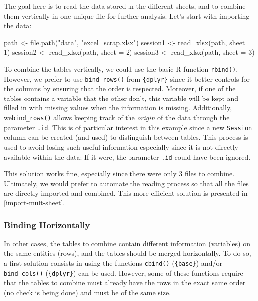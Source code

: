 \documentclass[
]{krantz}
\makeatletter
\newenvironment{Shaded}{\begin{snugshade}}{\end{snugshade}}
\newcommand{\AttributeTok}[1]{\textcolor[rgb]{0.61,0.61,0.61}{#1}}
\newcommand{\DecValTok}[1]{\textcolor[rgb]{0.06,0.06,0.06}{#1}}
\newcommand{\FunctionTok}[1]{\textcolor[rgb]{0,0,0}{#1}}
\newcommand{\NormalTok}[1]{#1}
\newcommand{\OtherTok}[1]{\textcolor[rgb]{0.37,0.37,0.37}{#1}}
\newcommand{\StringTok}[1]{\textcolor[rgb]{0.5,0.5,0.5}{#1}}
\newenvironment{kframe}{%
\medskip{}
\setlength{\fboxsep}{.8em}
 \def\at@end@of@kframe{}%
 \ifinner\ifhmode%
  \def\at@end@of@kframe{\end{minipage}}%
  \begin{minipage}{\columnwidth}%
 \fi\fi%
 \def\FrameCommand##1{\hskip\@totalleftmargin \hskip-\fboxsep
 \colorbox{shadecolor}{##1}\hskip-\fboxsep
     \hskip-\linewidth \hskip-\@totalleftmargin \hskip\columnwidth}%
 \MakeFramed {\advance\hsize-\width
   \@totalleftmargin\z@ \linewidth\hsize
   \@setminipage}}%
 {\par\unskip\endMakeFramed%
 \at@end@of@kframe}
\renewenvironment{Shaded}{\begin{kframe}}{\end{kframe}}
\makeatother
\begin{document}
The goal here is to read the data stored in the different sheets, and to combine them vertically in one unique file for further analysis. Let's start with importing the data:

\begin{Shaded}
\begin{Highlighting}[]
\NormalTok{path }\OtherTok{\textless{}{-}} \FunctionTok{file.path}\NormalTok{(}\StringTok{"data"}\NormalTok{, }\StringTok{"excel\_scrap.xlsx"}\NormalTok{)}
\NormalTok{session1 }\OtherTok{\textless{}{-}} \FunctionTok{read\_xlsx}\NormalTok{(path, }\AttributeTok{sheet =} \DecValTok{1}\NormalTok{)}
\NormalTok{session2 }\OtherTok{\textless{}{-}} \FunctionTok{read\_xlsx}\NormalTok{(path, }\AttributeTok{sheet =} \DecValTok{2}\NormalTok{)}
\NormalTok{session3 }\OtherTok{\textless{}{-}} \FunctionTok{read\_xlsx}\NormalTok{(path, }\AttributeTok{sheet =} \DecValTok{3}\NormalTok{)}
\end{Highlighting}
\end{Shaded}

To combine the tables vertically, we could use the basic R function \texttt{rbind()}. However, we prefer to use \texttt{bind\_rows()} from \texttt{\{dplyr\}} since it better controls for the columns by ensuring that the order is respected. Moreover, if one of the tables contains a variable that the other don't, this variable will be kept and filled in with missing values when the information is missing. Additionally, we\texttt{bind\_rows()} allows keeping track of the \emph{origin} of the data through the parameter \texttt{.id}. This is of particular interest in this example since a new \texttt{Session} column can be created (and used) to distinguish between tables. This process is used to avoid losing such useful information especially since it is not directly available within the data: If it were, the parameter \texttt{.id} could have been ignored.

This solution works fine, especially since there were only 3 files to combine. Ultimately, we would prefer to automate the reading process so that all the files are directly imported and combined. This more efficient solution is presented in \ref{import-mult-sheet}.

\hypertarget{binding-horizontally}{%
\subsubsection*{Binding Horizontally}\label{binding-horizontally}}


In other cases, the tables to combine contain different information (variables) on the same entities (rows), and the tables should be merged horizontally. To do so, a first solution consists in using the functions \texttt{cbind()} (\texttt{\{base\}}) and/or \texttt{bind\_cols()} (\texttt{\{dplyr\}}) can be used. However, some of these functions require that the tables to combine must already have the rows in the exact same order (no check is being done) and must be of the same size.
\end{document}
